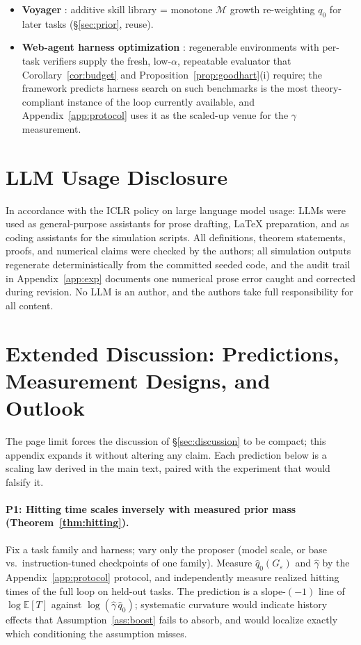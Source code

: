 \documentclass{article}
\theoremstyle{plain}
\theoremstyle{definition}
\theoremstyle{remark}
\newcommand{\M}{\mathcal{M}}
\newcommand{\E}{\mathbb{E}}
\newcommand{\eps}{\varepsilon}
\begin{document}
\begin{itemize}
\item \textbf{Voyager} \citep{wang2023voyager}: additive skill library = monotone $\M$ growth re-weighting $q_0$ for later tasks (\S\ref{sec:prior}, reuse).
\item \textbf{Web-agent harness optimization} \citep{zhou2024webarena}: regenerable environments with per-task verifiers supply the fresh, low-$\alpha$, repeatable evaluator that Corollary~\ref{cor:budget} and Proposition~\ref{prop:goodhart}(i) require; the framework predicts harness search on such benchmarks is the most theory-compliant instance of the loop currently available, and Appendix~\ref{app:protocol} uses it as the scaled-up venue for the $\gamma$ measurement.
\end{itemize}

\section{LLM Usage Disclosure}
\label{app:llm}

In accordance with the ICLR policy on large language model usage: LLMs were used as general-purpose assistants for prose drafting, LaTeX preparation, and as coding assistants for the simulation scripts. All definitions, theorem statements, proofs, and numerical claims were checked by the authors; all simulation outputs regenerate deterministically from the committed seeded code, and the audit trail in Appendix~\ref{app:exp} documents one numerical prose error caught and corrected during revision. No LLM is an author, and the authors take full responsibility for all content.

\section{Extended Discussion: Predictions, Measurement Designs, and Outlook}
\label{app:extended}

The page limit forces the discussion of \S\ref{sec:discussion} to be compact; this appendix expands it without altering any claim. Each prediction below is a scaling law derived in the main text, paired with the experiment that would falsify it.

\paragraph{P1: Hitting time scales inversely with measured prior mass (Theorem~\ref{thm:hitting}).}
Fix a task family and harness; vary only the proposer (model scale, or base vs.\ instruction-tuned checkpoints of one family). Measure $\hat q_0(G_\eps)$ and $\hat\gamma$ by the Appendix~\ref{app:protocol} protocol, and independently measure realized hitting times of the full loop on held-out tasks. The prediction is a slope-$(-1)$ line of $\log \E[T]$ against $\log(\hat\gamma\,\hat q_0)$; systematic curvature would indicate history effects that Assumption~\ref{ass:boost} fails to absorb, and would localize exactly which conditioning the assumption misses.
\end{document}
